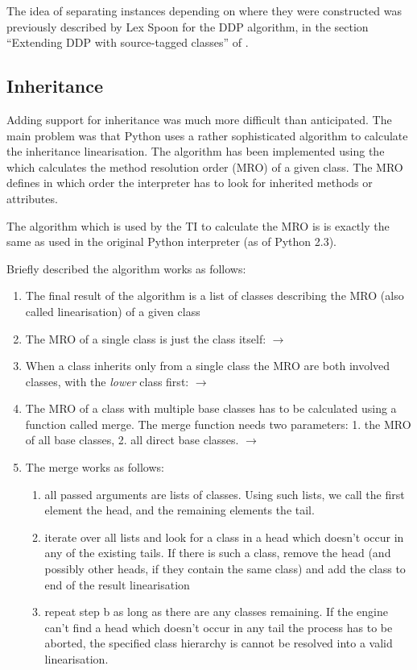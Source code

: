 \documentclass[12pt,halfparskip,DIV11,BCOR10mm]{scrreprt}
\begin{document}
The idea of separating instances depending on where they were constructed was previously described by Lex Spoon for the DDP algorithm, in the section ``Extending DDP with source-tagged classes'' of \cite{ddp}.


\subsection{Inheritance}

Adding support for inheritance was much more difficult than anticipated. The main problem was that Python uses a rather sophisticated algorithm to calculate the inheritance linearisation. The algorithm has been implemented using the  which calculates the method resolution
order (MRO) of a given class. The MRO defines in which order the interpreter has to look for inherited methods or attributes. 

The algorithm which is used by the TI to calculate the MRO is is exactly the same as used in the original 
Python interpreter (as of Python 2.3).

Briefly described the algorithm works as follows: 
\begin{enumerate}
    \item The final result of the algorithm is a list of classes describing the MRO (also called linearisation) of a given class 
    \item The MRO of a single class is just the class itself:  $\rightarrow$ 
    \item When a class inherits only from a single class the MRO are both involved classes,  with the \emph{lower} class first:  $\rightarrow$ 
    \item The MRO of a class with multiple base classes has to be calculated using a function called merge. The merge function needs two parameters: 1. the MRO of all base classes, 2. all direct base classes.   $\rightarrow$ 
    \item The merge works as follows:
 \begin{enumerate}
    \item all passed arguments are lists of classes. Using such lists, we call the first element the head, and the remaining elements the tail. 
    \item iterate over all lists and look for a class in a head which doesn't occur in any of the existing tails. If there is such a class, remove the head (and possibly other heads, if they contain the same class) and add the class to end of the result linearisation
    \item repeat step b as long as there are any classes remaining. If the engine can't find a head which doesn't occur in any tail the process has to be aborted, the specified class hierarchy is cannot be resolved into a valid linearisation. 
 \end{enumerate}
\end{enumerate}
\end{document}

